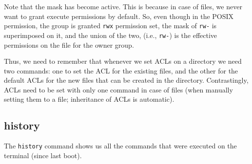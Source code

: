 \noindent
Note that the mask has become active. This is because in case of files, we never want to grant execute permissions by default. So, even though in the POSIX permission, the group is granted \verb|rwx| permission set, the mask of \verb|rw-| is superimposed on it, and the union of the two, (i.e., \verb|rw-|) is the effective permissions on the file for the owner group. 

Thus, we need to remember that whenever we set ACLs on a directory we need two commands: one to set the ACL for the existing files, and the other for the default ACLs for the new files that can be created in the directory. Contrastingly, ACLs need to be set with only one command in case of files (when manually setting them to a file; inheritance of ACLs is automatic). 

\subsection{history}
The \verb|history| command shows us all the commands that were executed on the terminal (since last boot).